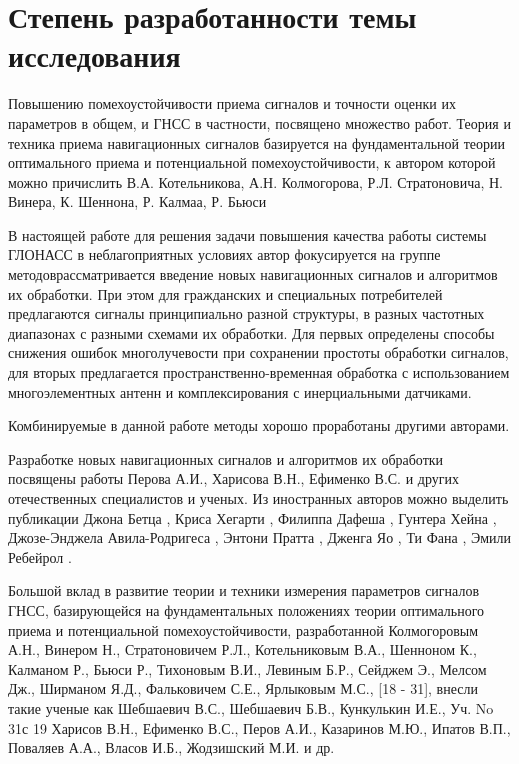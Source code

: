 \section*{Степень разработанности темы исследования}

Повышению помехоустойчивости приема сигналов и точности оценки их параметров в общем, и ГНСС в частности, посвящено множество работ. 
Теория и техника приема навигационных сигналов базируется на фундаментальной теории оптимального приема и потенциальной помехоустойчивости, к автором которой можно причислить В.А. Котельникова, А.Н. Колмогорова, Р.Л. Стратоновича, Н. Винера, К. Шеннона, Р. Калмаа, Р. Бьюси

В настоящей работе для решения задачи повышения качества работы системы ГЛОНАСС в неблагоприятных условиях автор фокусируется на группе методоврассматривается введение новых навигационных сигналов и алгоритмов их обработки. 
При этом для гражданских и специальных потребителей предлагаются сигналы принципиально разной структуры, в разных частотных диапазонах с разными схемами их обработки. 
Для первых определены способы снижения ошибок многолучевости при сохранении простоты обработки сигналов, для вторых предлагается пространственно-временная обработка с использованием многоэлементных антенн и комплексирования с инерциальными датчиками.

Комбинируемые в данной работе методы хорошо проработаны другими авторами. 

Разработке новых навигационных сигналов и алгоритмов их обработки посвящены работы Перова А.И., Харисова В.Н., Ефименко В.С. и других отечественных специалистов и ученых. 
Из иностранных авторов можно выделить публикации Джона Бетца \cite{betz1999, betz2000, betz2001, betz2002, betz2010, betz2013, betz2019}, Криса Хегарти \cite{tran2003, hegarty2004, titus2004, hegarty2013}, Филиппа Дафеша \cite{dafesh1999, dafesh2000, dafesh2009, dafesh2011}, Гунтера Хейна \cite{hein2006, mateu2009}, Джозе-Энджела Авила-Родригеса \cite{avila2006, avila2006_2, wallner2007, avila2007, avila2008, avila2008_2, schmitz2008}, Энтони Пратта \cite{pratt2002, pratt2005},  Дженга Яо \cite{yao2011, yao2011_2, zhang2012, yao2013, zhang2014, guo2014, zhu2014, guo2016, liu2016, zhang2016, zhou2016, yao2017, lu2019, wang2020}, Ти Фана \cite{wang2004, fan2005, fan2008}, Эмили Ребейрол \cite{rebeyrol2005, rebeyrol2006, rebeyrol2006_2, rebeyrol2006_3}.
 
Большой вклад в
развитие
 теории
 и
 техники
 измерения
 параметров
 сигналов
 ГНСС,
базирующейся на фундаментальных положениях теории оптимального приема
и потенциальной помехоустойчивости, разработанной Колмогоровым А.Н.,
Винером Н., Стратоновичем Р.Л., Котельниковым В.А., Шенноном К.,
Калманом Р.,
 Бьюси
 Р.,
 Тихоновым В.И.,
 Левиным Б.Р.,
 Сейджем Э.,
Мелсом Дж., Ширманом Я.Д., Фальковичем С.Е., Ярлыковым М.С., [18 - 31],
внесли такие ученые как Шебшаевич В.С., Шебшаевич Б.В., Кункулькин И.Е.,
Уч. No 31с
19
Харисов В.Н., Ефименко В.С., Перов А.И., Казаринов М.Ю., Ипатов В.П.,
Поваляев А.А., Власов И.Б., Жодзишский М.И. и др.
 
